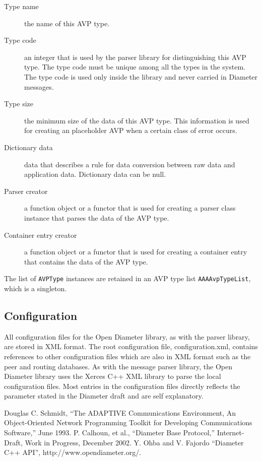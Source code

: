 \documentclass{article}
\begin{document}
\begin{description}
 \item[Type name] the name of this AVP type.
 \item[Type code] an integer that is used by the parser library for
 distinguishing this AVP type.  The type code must be unique among all
 the types in the system.  The type code is used only inside the library
 and never carried in Diameter messages.
 \item[Type size] the minimum size of the data of this AVP type.  This
 information is used for creating an placeholder AVP when a certain
 class of error occurs.
 \item[Dictionary data] data that describes a rule for data conversion
 between raw data and application data.  Dictionary data can be null.
 \item[Parser creator] a function object or a functor that is used for
 creating a parser class instance that parses the data of the AVP type.
 \item[Container entry creator] a function object or a functor that is
 used for creating a container entry that contains the data of the AVP
 type.
\end{description}

The list of {\tt AVPType} instances are retained in an AVP type list
{\tt AAAAvpTypeList}, which is a singleton.


\subsection{Configuration\label{sec:configuration}}

All configuration files for the Open Diameter library, as with the
parser library, are stored in XML format. The root configuration file,
configuration.xml, contains references to other configuration files
which are also in XML format such as the peer and routing databases. As
with the message parser library, the Open Diameter library uses the
Xerces C++ XML library to parse the local configuration files. Most
entries in the configuration files directly reflects the parameter
stated in the Diameter draft \cite{basep} and are self explanatory.

\begin{thebibliography}{Bibliography}
Douglas C. Schmidt, ``The ADAPTIVE Communications
Environment, An Object-Oriented Network Programming Toolkit for
Developing Communications Software,'' June 1993.
P. Calhoun, et al., ``Diameter Base Protocol,''
Internet-Draft, Work in Progress, December 2002.
 Y. Ohba and V. Fajordo ``Diameter C++ API'',
http://www.opendiameter.org/.
\end{thebibliography}
\end{document}
